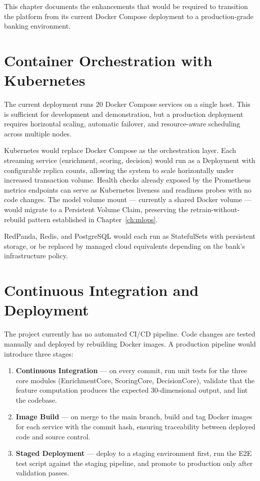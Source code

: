 This chapter documents the enhancements that would be required to transition
the platform from its current Docker Compose deployment to a
production-grade banking environment.

\section{Container Orchestration with Kubernetes}
\label{sec:kubernetes}

The current deployment runs 20 Docker Compose services on a single host.
This is sufficient for development and demonstration, but a production
deployment requires horizontal scaling, automatic failover, and
resource-aware scheduling across multiple nodes.

Kubernetes would replace Docker Compose as the orchestration layer. Each
streaming service (enrichment, scoring, decision) would run as a Deployment
with configurable replica counts, allowing the system to scale horizontally
under increased transaction volume. Health checks already exposed by the
Prometheus metrics endpoints can serve as Kubernetes liveness and readiness
probes with no code changes. The model volume mount --- currently a shared
Docker volume --- would migrate to a Persistent Volume Claim, preserving
the retrain-without-rebuild pattern established in
Chapter~\ref{ch:mlops}.

RedPanda, Redis, and PostgreSQL would each run as StatefulSets with
persistent storage, or be replaced by managed cloud equivalents depending
on the bank's infrastructure policy.


\section{Continuous Integration and Deployment}
\label{sec:cicd}

The project currently has no automated CI/CD pipeline. Code changes are
tested manually and deployed by rebuilding Docker images. A production
pipeline would introduce three stages:

\begin{enumerate}
    \item \textbf{Continuous Integration} --- on every commit, run unit
          tests for the three core modules (EnrichmentCore, ScoringCore,
          DecisionCore), validate that the feature computation produces
          the expected 30-dimensional output, and lint the codebase.
    \item \textbf{Image Build} --- on merge to the main branch, build and
          tag Docker images for each service with the commit hash,
          ensuring traceability between deployed code and source control.
    \item \textbf{Staged Deployment} --- deploy to a staging environment
          first, run the E2E test script against the staging pipeline,
          and promote to production only after validation passes.
\end{enumerate}

